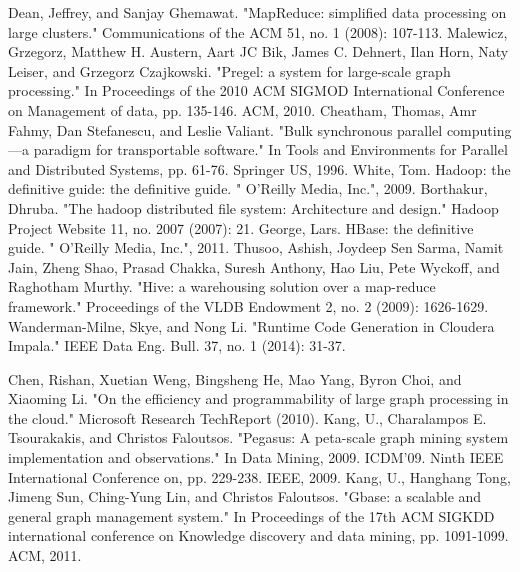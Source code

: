 \documentclass[conference]{IEEEtran}
\begin{document}

%
%
%
\begin{thebibliography}{1}
Dean, Jeffrey, and Sanjay Ghemawat. "MapReduce: simplified data processing on large clusters." Communications of the ACM 51, no. 1 (2008): 107-113.
Malewicz, Grzegorz, Matthew H. Austern, Aart JC Bik, James C. Dehnert, Ilan Horn, Naty Leiser, and Grzegorz Czajkowski. "Pregel: a system for large-scale graph processing." In Proceedings of the 2010 ACM SIGMOD International Conference on Management of data, pp. 135-146. ACM, 2010.
Cheatham, Thomas, Amr Fahmy, Dan Stefanescu, and Leslie Valiant. "Bulk synchronous parallel computing—a paradigm for transportable software." In Tools and Environments for Parallel and Distributed Systems, pp. 61-76. Springer US, 1996.
White, Tom. Hadoop: the definitive guide: the definitive guide. " O'Reilly Media, Inc.", 2009.
Borthakur, Dhruba. "The hadoop distributed file system: Architecture and design." Hadoop Project Website 11, no. 2007 (2007): 21.
George, Lars. HBase: the definitive guide. " O'Reilly Media, Inc.", 2011.
Thusoo, Ashish, Joydeep Sen Sarma, Namit Jain, Zheng Shao, Prasad Chakka, Suresh Anthony, Hao Liu, Pete Wyckoff, and Raghotham Murthy. "Hive: a warehousing solution over a map-reduce framework." Proceedings of the VLDB Endowment 2, no. 2 (2009): 1626-1629.
Wanderman-Milne, Skye, and Nong Li. "Runtime Code Generation in Cloudera Impala." IEEE Data Eng. Bull. 37, no. 1 (2014): 31-37.

Chen, Rishan, Xuetian Weng, Bingsheng He, Mao Yang, Byron Choi, and Xiaoming Li. "On the efficiency and programmability of large graph processing in the cloud." Microsoft Research TechReport (2010).
Kang, U., Charalampos E. Tsourakakis, and Christos Faloutsos. "Pegasus: A peta-scale graph mining system implementation and observations." In Data Mining, 2009. ICDM'09. Ninth IEEE International Conference on, pp. 229-238. IEEE, 2009.
Kang, U., Hanghang Tong, Jimeng Sun, Ching-Yung Lin, and Christos Faloutsos. "Gbase: a scalable and general graph management system." In Proceedings of the 17th ACM SIGKDD international conference on Knowledge discovery and data mining, pp. 1091-1099. ACM, 2011.


\end{thebibliography}
\end{document}
